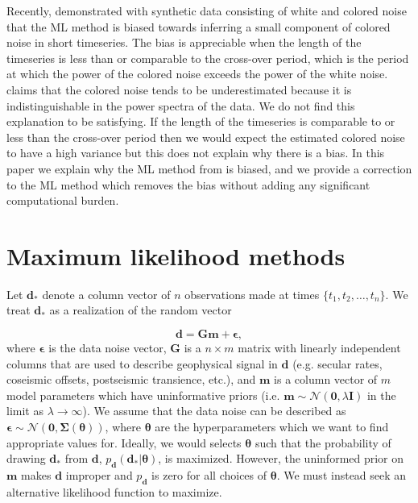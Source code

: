 \documentclass[10pt,a4paper]{article}
\begin{document}
Recently, \citet{Langbein2012} demonstrated with synthetic data consisting of white and colored noise that the ML method is biased towards inferring a small component of colored noise in short timeseries.  The bias is appreciable when the length of the timeseries is less than or comparable to the cross-over period, which is the period at which the power of the colored noise exceeds the power of the white noise. \citet{Langbein2012} claims that the colored noise tends to be underestimated because it is indistinguishable in the power spectra of the data. We do not find this explanation to be satisfying. If the length of the timeseries is comparable to or less than the cross-over period then we would expect the estimated colored noise to have a high variance but this does not explain why there is a bias. In this paper we explain why the ML method from \citet{Langbein1997} is biased, and we provide a correction to the ML method which removes the bias without adding any significant computational burden. 

\section{Maximum likelihood methods}

Let $\mathbf{d_*}$ denote a column vector of $n$ observations made at times $\{t_1,t_2,\dots,t_n\}$. We treat $\mathbf{d_*}$ as a realization of the random vector

\begin{equation}\label{LangbeinModel}
  \mathbf{d} = \mathbf{Gm} + \mathbf{\epsilon},
\end{equation}
where $\mathbf{\epsilon}$ is the data noise vector, $\mathbf{G}$ is a $n \times m$ matrix with linearly independent columns that are used to describe geophysical signal in $\mathbf{d}$ (e.g. secular rates, coseismic offsets, postseismic transience, etc.), and $\mathbf{m}$ is a column vector of $m$ model parameters which have uninformative priors (i.e. $\mathbf{m} \sim \mathcal{N}(\mathbf{0},\lambda\mathbf{I})$ in the limit as $\lambda \to \infty$).  We assume that the data noise can be described as $\mathbf{\epsilon} \sim \mathcal{N}(\mathbf{0},\mathbf{\Sigma}(\mathbf{\theta}))$, where $\mathbf{\theta}$ are the hyperparameters which we want to find appropriate values for. Ideally, we would selects $\mathbf{\theta}$ such that the probability of drawing $\mathbf{d_*}$ from $\mathbf{d}$, $p_\mathbf{d}(\mathbf{d_*}|\mathbf{\theta})$, is maximized. However, the uninformed prior on $\mathbf{m}$ makes $\mathbf{d}$ improper and $p_\mathbf{d}$ is zero for all choices of $\mathbf{\theta}$. We must instead seek an alternative likelihood function to maximize. 
\end{document}
